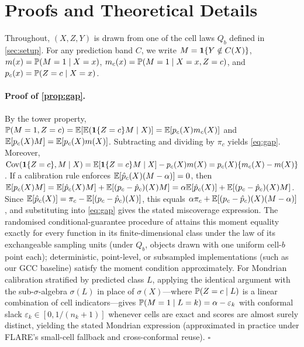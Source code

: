 \section{Proofs and Theoretical Details}
\label{app:proofs}

Throughout, $(X,Z,Y)$ is drawn from one of the cell laws $Q_b$ defined in \cref{sec:setup}.
For any prediction band $C$, we write $M=\one\{Y\notin C(X)\}$, $m(x)=\P(M=1\mid X=x)$, $m_c(x)=\P(M=1\mid X=x,Z=c)$, and $p_c(x)=\P(Z=c\mid X=x)$.

\paragraph{Proof of \cref{prop:gap}.}
By the tower property, $\P(M=1,Z=c)=\E[\E(\one\{Z=c\}M\mid X)]=\E[p_c(X)m_c(X)]$ and $\E[p_c(X)M]=\E[p_c(X)m(X)]$.
Subtracting and dividing by $\pi_c$ yields \cref{eq:gap}.
Moreover, $\Cov(\one\{Z=c\},M\mid X)=\E[\one\{Z=c\}M\mid X]-p_c(X)m(X)=p_c(X)\{m_c(X)-m(X)\}$.
If a calibration rule enforces $\E[\hat p_c(X)(M-\alpha)]=0$, then
$\E[p_c(X)M]=\E[\hat p_c(X)M]+\E[(p_c-\hat p_c)(X)M]=\alpha\E[\hat p_c(X)]+\E[(p_c-\hat p_c)(X)M]$.
Since $\E[\hat p_c(X)]=\pi_c-\E[(p_c-\hat p_c)(X)]$, this equals $\alpha\pi_c+\E[(p_c-\hat p_c)(X)(M-\alpha)]$, and substituting into \cref{eq:gap} gives the stated miscoverage expression.
The randomised conditional-guarantee procedure of \citet{gibbs2025conformal} attains this moment equality exactly for every function in its finite-dimensional class under the law of its exchangeable sampling units (under $Q_b$, objects drawn with one uniform cell-$b$ point each); deterministic, point-level, or subsampled implementations (such as our GCC baseline) satisfy the moment condition approximately.
For Mondrian calibration stratified by predicted class $L$, applying the identical argument with the sub-$\sigma$-algebra $\sigma(L)$ in place of $\sigma(X)$---where $\P(Z=c\mid L)$ is a linear combination of cell indicators---gives $\P(M=1\mid L=k)=\alpha-\varepsilon_k$ with conformal slack $\varepsilon_k\in[0,1/(n_k+1)]$ whenever cells are exact and scores are almost surely distinct, yielding the stated Mondrian expression (approximated in practice under FLARE's small-cell fallback and cross-conformal reuse).
\hfill$\square$


